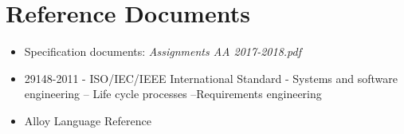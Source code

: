\section{Reference Documents}
\begin{itemize}

\item Specification documents: \emph{Assignments AA 2017-2018.pdf}

\item 29148-2011 - ISO/IEC/IEEE International Standard - Systems and software engineering -- Life cycle processes --Requirements engineering

\item Alloy Language Reference
\end{itemize}